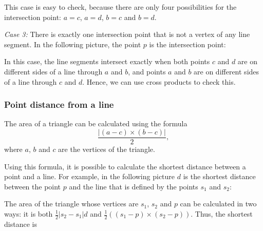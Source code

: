 This case is easy to check, because
there are only four possibilities
for the intersection point:
$a=c$, $a=d$, $b=c$ and $b=d$.

\textit{Case 3:}
There is exactly one intersection point
that is not a vertex of any line segment.
In the following picture, the point $p$
is the intersection point:
\begin{center}
\end{center}

In this case, the line segments intersect
exactly when both points $c$ and $d$ are
on different sides of a line through $a$ and $b$,
and points $a$ and $b$ are on different
sides of a line through $c$ and $d$.
Hence, we can use cross products to check this.

\subsubsection{Point distance from a line}

The area of a triangle can be calculated
using the formula
\[\frac{| (a-c) \times (b-c) |}{2},\]
where $a$, $b$ and $c$ are the vertices of the triangle.

Using this formula, it is possible to calculate the
shortest distance between a point and a line.
For example, in the following picture $d$ is the
shortest distance between the point $p$ and the line
that is defined by the points $s_1$ and $s_2$:
\begin{center}
\end{center}

The area of the triangle whose vertices are
$s_1$, $s_2$ and $p$ can be calculated in two ways:
it is both
$\frac{1}{2} |s_2-s_1| d$ and
$\frac{1}{2} ((s_1-p) \times (s_2-p))$.
Thus, the shortest distance is

